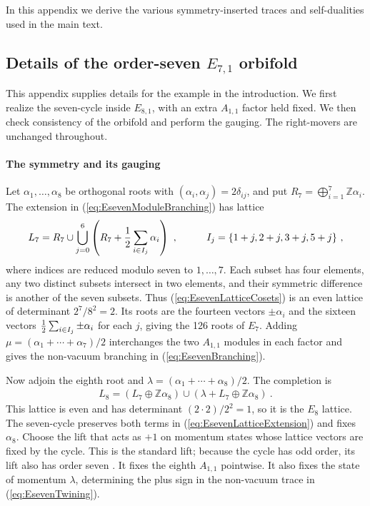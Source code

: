\documentclass[12pt]{article}
\numberwithin{equation}{section}
\newcommand{\bea}{\begin{eqnarray}}
\newcommand{\eea}{\end{eqnarray}}
\def\ZZ{\mathbb{Z}}
\theoremstyle{remark}
\begin{document}
In this appendix we derive the various symmetry-inserted traces and self-dualities used in the main text.

\subsection{Details of the order-seven $E_{7,1}$ orbifold}
\label{app:E7}

This appendix supplies details for the example in the introduction. We first realize the seven-cycle inside $E_{8,1}$, with an extra $A_{1,1}$ factor held fixed. We then check consistency of the orbifold and perform the gauging. The right-movers are unchanged throughout.

\paragraph{The symmetry and its gauging}
Let $\alpha_1,\ldots,\alpha_8$ be orthogonal roots with $(\alpha_i,\alpha_j)=2\delta_{ij}$, and put $R_7=\bigoplus_{i=1}^7\ZZ\alpha_i$. The extension in (\ref{eq:EsevenModuleBranching}) has lattice
\bea \label{eq:EsevenLatticeCosets}
L_7=R_7\cup\bigcup_{j=0}^6\left(R_7+{1\over2}\sum_{i\in I_j}\alpha_i\right)~,
\hspace{0.4 in}I_j=\{1+j,2+j,3+j,5+j\}~,
\eea
where indices are reduced modulo seven to $1,\ldots,7$. Each subset has four elements, any two distinct subsets intersect in two elements, and their symmetric difference is another of the seven subsets. Thus (\ref{eq:EsevenLatticeCosets}) is an even lattice of determinant $2^7/8^2=2$. Its roots are the fourteen vectors $\pm\alpha_i$ and the sixteen vectors ${1\over2}\sum_{i\in I_j}\pm\alpha_i$ for each $j$, giving the 126 roots of $E_7$. Adding $\mu=(\alpha_1+\cdots+\alpha_7)/2$ interchanges the two $A_{1,1}$ modules in each factor and gives the non-vacuum branching in (\ref{eq:EsevenBranching}).

Now adjoin the eighth root and $\lambda=(\alpha_1+\cdots+\alpha_8)/2$. The completion is
\bea \label{eq:EsevenLatticeExtension}
L_8=(L_7\oplus\ZZ\alpha_8)\cup\left(\lambda+L_7\oplus\ZZ\alpha_8\right)~.
\eea
This lattice is even and has determinant $(2\cdot2)/2^2=1$, so it is the $E_8$ lattice. The seven-cycle preserves both terms in (\ref{eq:EsevenLatticeExtension}) and fixes $\alpha_8$. Choose the lift that acts as $+1$ on momentum states whose lattice vectors are fixed by the cycle. This is the standard lift; because the cycle has odd order, its lift also has order seven \cite{vanEkeren:2017scl}. It fixes the eighth $A_{1,1}$ pointwise. It also fixes the state of momentum $\lambda$, determining the plus sign in the non-vacuum trace in (\ref{eq:EsevenTwining}).
\end{document}
